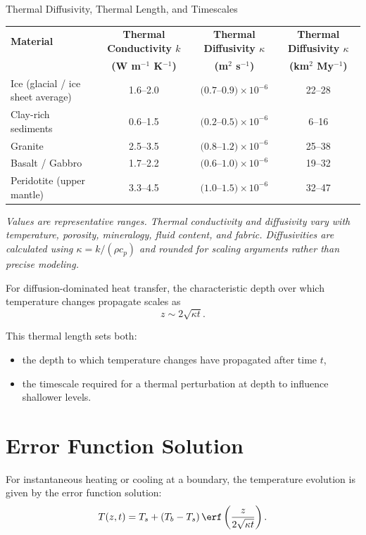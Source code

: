\begin{activity}{Thermal Diffusivity, Thermal Length, and Timescales}
\begin{table}[h]
    \centering
    \begin{tabular}{lccc}
        \toprule
        \textbf{Material} &
        \textbf{Thermal Conductivity $k$} &
        \textbf{Thermal Diffusivity $\kappa$} &
        \textbf{Thermal Diffusivity $\kappa$} \\
        &
        \textbf{(W m$^{-1}$ K$^{-1}$)} &
        \textbf{(m$^2$ s$^{-1}$)} &
        \textbf{(km$^2$ My$^{-1}$)} \\
        \midrule
        Ice (glacial / ice sheet average) & 1.6--2.0 & $(0.7$--$0.9)\times10^{-6}$ & 22--28 \\
        Clay-rich sediments               & 0.6--1.5 & $(0.2$--$0.5)\times10^{-6}$ & 6--16  \\
        Granite                           & 2.5--3.5 & $(0.8$--$1.2)\times10^{-6}$ & 25--38 \\
        Basalt / Gabbro                   & 1.7--2.2 & $(0.6$--$1.0)\times10^{-6}$ & 19--32 \\
        Peridotite (upper mantle)         & 3.3--4.5 & $(1.0$--$1.5)\times10^{-6}$ & 32--47 \\
        \bottomrule
    \end{tabular}
\end{table}

\smallskip
\noindent
\textit{Values are representative ranges. Thermal conductivity and diffusivity
vary with temperature, porosity, mineralogy, fluid content, and fabric.
Diffusivities are calculated using $\kappa = k/(\rho c_p)$ and rounded for
scaling arguments rather than precise modeling.}

For diffusion-dominated heat transfer, the characteristic depth over which temperature changes propagate scales as
\[
z \sim 2 \sqrt{\kappa t}.
\]

This thermal length sets both:
\begin{itemize}
  \item the depth to which temperature changes have propagated after time $t$,
  \item the timescale required for a thermal perturbation at depth to influence shallower levels.
\end{itemize}

\section*{Error Function Solution}

For instantaneous heating or cooling at a boundary, the temperature evolution is given by the error function solution:
\[
T(z,t) = T_s + (T_b - T_s)\,\erf \left(\frac{z}{2\sqrt{\kappa t}}\right).
\]


\end{activity}
